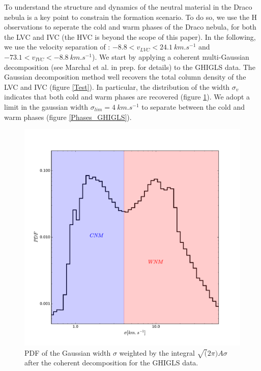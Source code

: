 \documentclass[traditabstract]{aa}
\begin{document}
   To understand the structure and dynamics of the neutral material in the Draco nebula is a key point to constrain the formation scenario. To do so, we use the H observations to seperate the cold and warm phases of the Draco nebula, for both the LVC and IVC (the HVC is beyond the scope of this paper). In the following, we use the velocity separation of \cite{Planck_XXIV_2011}: $-8.8<v_{LVC}<24.1\: km.s^{-1}$ and $-73.1<v_{IVC}<-8.8\: km.s^{-1}$).
We start by applying a coherent multi-Gaussian decomposition (see Marchal et al. in prep. for details) to the GHIGLS data. The Gaussian decomposition method well recovers the total column density of the LVC and IVC (figure \ref{Test}). In particular, the distribution of the width $\sigma_v$ indicates that both cold and warm phases are recovered (figure \ref{PDF_sigma}). We adopt a limit in the gaussian width $\sigma_{lim}=4\: km.s^{-1}$ to separate between the
cold and warm phases (figure \ref{Phases_GHIGLS}).

\begin{figure}
  \includegraphics[width=\linewidth]{Figures/PDF_sigma_over_A.pdf}
  \caption{\label{PDF_sigma} PDF of the Gaussian width $\sigma$ weighted by the integral $\sqrt(2\pi)A\sigma$ after the coherent decomposition for the GHIGLS data.}
\end{figure}
\end{document}
